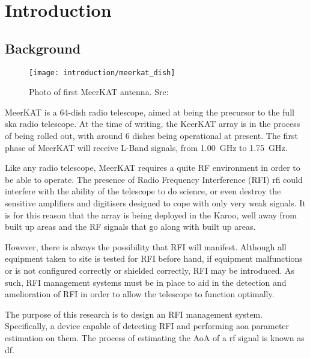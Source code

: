 \chapter{Introduction}
\label{ch:introduction}
\section{Background}
\begin{wrapfigure}{r}{0.4\textwidth}
  \begin{center}
    \texttt{[image: introduction/meerkat\_dish]}
  \end{center}
  \caption{Photo of first MeerKAT antenna. Src: \cite{skasawebsite}}
\end{wrapfigure}
MeerKAT is a 64-dish radio telescope, aimed at being the precursor to the full \gls{ska} radio telescope. At the time of writing, the KeerKAT array is in the process of being rolled out, with around 6 dishes being operational at present.
The first phase of MeerKAT will receive L-Band signals, from \SI{1.00}{\giga\hertz} to \SI{1.75}{\giga\hertz}. 

Like any radio telescope, MeerKAT requires a quite RF environment in order to be able to operate. 
The presence of Radio Frequency Interference (RFI) \gls{rfi} could interfere with the ability of the telescope to do science, or even destroy the sensitive amplifiers and digitisers designed to cope with only very weak signals.
It is for this reason that the array is being deployed in the Karoo, well away from built up areas and the RF signals that go along with built up areas. 

However, there is always the possibility that RFI will manifest. 
Although all equipment taken to site is tested for RFI before hand, if equipment malfunctions or is not configured correctly or shielded correctly, RFI may be introduced.
As such, RFI management systems must be in place to aid in the detection and amelioration of RFI in order to allow the telescope to function optimally.

The purpose of this research is to design an RFI management system. 
Specifically, a device capable of detecting RFI and performing \gls{aoa} parameter estimation on them. 
The process of estimating the AoA of a \gls{rf} signal is known as \gls{df}.



